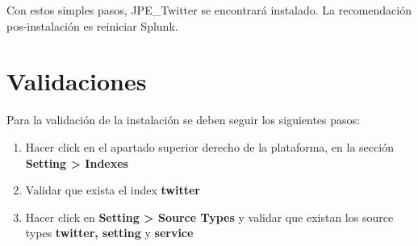 \documentclass[a4paper]{article}
\begin{document}
Con estos simples pasos, JPE\_Twitter se encontrar\'a instalado. La recomendaci\'on pos-instalaci\'on es reiniciar Splunk.
\newpage
\section{Validaciones}

Para la validaci\'on de la instalaci\'on se deben seguir los siguientes pasos:
\newline

\begin{enumerate}[label=(\alph*)]
\item Hacer click en el apartado superior derecho de la plataforma, en la secci\'on \textbf{Setting > Indexes}
\item Validar que exista el index \textbf{twitter}
\item Hacer click en \textbf{Setting > Source Types} y validar que existan los source types \textbf{twitter, setting} y \textbf{service}
\newline
\end{enumerate}
\end{document}
